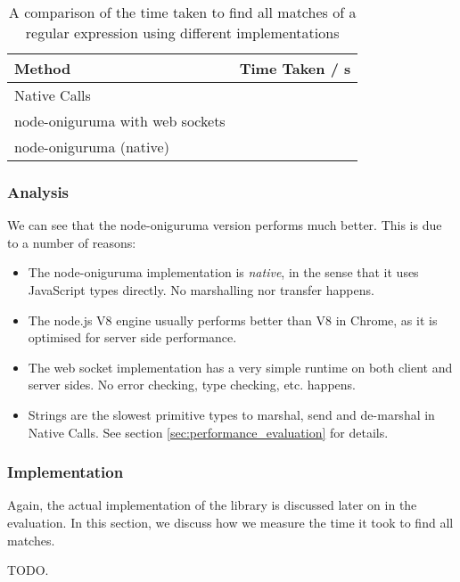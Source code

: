 \begin{table}[h]
\begin{tabular}{l|l}
\textbf{Method}                 & \textbf{Time Taken / s} \\ \hline
Native Calls                    &                     \\
node-oniguruma with web sockets &                     \\
node-oniguruma (native)         &                    
\end{tabular}
\caption{A comparison of the time taken to find all matches of a regular expression using different implementations}
\label{table:onig_time_taken}
\end{table}


\subsubsection{Analysis} %
\label{ssub:onig_analysis}
We can see that the node-oniguruma version performs much better. This is due to a number of reasons:
\begin{itemize}
  \item The node-oniguruma implementation is \emph{native}, in the sense that it uses JavaScript types directly. No marshalling nor transfer happens.
  \item The node.js V8 engine usually performs better than V8 in Chrome, as it is optimised for server side performance.
  \item The web socket implementation has a very simple runtime on both client and server sides. No error checking, type checking, etc. happens.
  \item Strings are the slowest primitive types to marshal, send and de-marshal in Native Calls. See section \ref{sec:performance_evaluation} for details.
\end{itemize}

\subsubsection{Implementation} %
\label{ssub:onig_implementation}
Again, the actual implementation of the library is discussed later on in the evaluation. In this section, we discuss how we measure the time it took to find all matches.

TODO.

